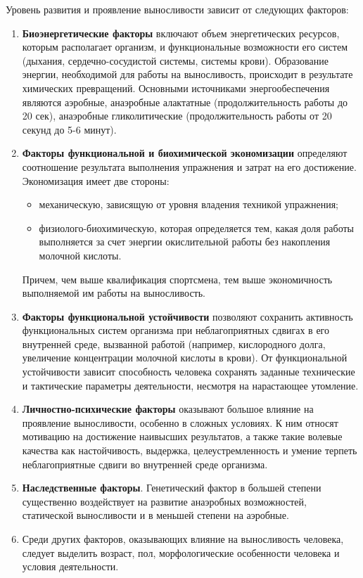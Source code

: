 Уровень развития и проявление выносливости зависит от следующих факторов:
\begin{enumerate}
    \item \textbf{Биоэнергетические факторы} включают объем энергетических ресурсов, которым располагает организм, и
          функциональные возможности его систем (дыхания, сердечно-сосудистой системы, системы крови).
          Образование энергии, необходимой для работы на выносливость, происходит в результате химических превращений.
          Основными источниками энергообеспечения являются аэробные, анаэробные алактатные (продолжительность работы до 20 сек),
          анаэробные гликолитические (продолжительность работы от 20 секунд до 5-6 минут).
    \item \textbf{Факторы функциональной и биохимической экономизации} определяют соотношение результата выполнения
          упражнения и затрат на его достижение. Экономизация имеет две стороны:
          \begin{itemize}
              \item механическую, зависящую от уровня владения техникой упражнения;
              \item физиолого-биохимическую, которая определяется тем, какая доля работы выполняется за счет энергии
                    окислительной работы без накопления молочной кислоты.
          \end{itemize}
          Причем, чем выше квалификация спортсмена, тем выше экономичность выполняемой им работы на выносливость.
    \item \textbf{Факторы функциональной устойчивости} позволяют сохранить активность функциональных систем организма при
          неблагоприятных сдвигах в его внутренней среде, вызванной работой (например, кислородного долга, увеличение
          концентрации молочной кислоты в крови). От функциональной устойчивости зависит способность человека сохранять
          заданные технические и тактические параметры деятельности, несмотря на нарастающее утомление.
    \item \textbf{Личностно-психические факторы} оказывают большое влияние на проявление выносливости, особенно в сложных
          условиях. К ним относят мотивацию на достижение наивысших результатов, а также такие волевые качества как
          настойчивость, выдержка, целеустремленность и умение терпеть неблагоприятные сдвиги во внутренней среде организма.
    \item \textbf{Наследственные факторы}. Генетический фактор в большей степени существенно воздействует на развитие анаэробных
          возможностей, статической выносливости и в меньшей степени на аэробные.
    \item Среди других факторов, оказывающих влияние на выносливость человека, следует выделить возраст, пол, морфологические
          особенности человека и условия деятельности.
\end{enumerate}


